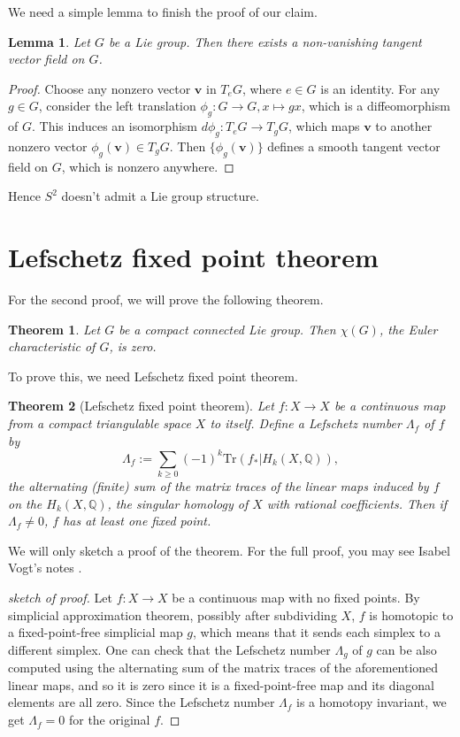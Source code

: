 \documentclass{article}
\newtheorem{theorem}{Theorem}
\newtheorem{lemma}{Lemma}
\begin{document}
We need a simple lemma to finish the proof of our claim. 
\begin{lemma}
Let $G$ be a Lie group. Then there exists a non-vanishing tangent vector field on $G$. 
\end{lemma}
\begin{proof}
Choose any nonzero vector $\mathbf{v}$ in $T_{e}G$, where $e\in G$ is an identity. For any $g\in G$, consider the left translation $\phi_{g}:G\to G, x\mapsto gx$, which is a diffeomorphism of $G$. This induces an isomorphism $d\phi_{g}:T_{e}G\to T_{g}G$, which maps $\mathbf{v}$ to another nonzero vector $\phi_{g}(\mathbf{v})\in T_{g}G$. Then $\{\phi_{g}(\mathbf{v})\}$ defines a smooth tangent vector field on $G$, which is nonzero anywhere. 
\end{proof}
Hence $S^{2}$ doesn't admit a Lie group structure.


\section{Lefschetz fixed point theorem}
For the second proof, we will prove the following theorem. 
\begin{theorem}
Let $G$ be a compact connected Lie group. Then $\chi(G)$, the Euler characteristic of $G$, is zero. 
\end{theorem}
To prove this, we need Lefschetz fixed point theorem. 

\begin{theorem}[Lefschetz fixed point theorem]
Let $f:X\to X$ be a continuous map from a compact triangulable space $X$ to itself. Define a Lefschetz number $\Lambda_{f}$ of $f$ by 
$$
\Lambda_{f}:=\sum_{k\geq 0}(-1)^{k}\mathrm{Tr}(f_{*}|H_{k}(X, \mathbb{Q})), 
$$
the alternating (finite) sum of the matrix traces of the linear maps induced by $f$ on the $H_{k}(X, \mathbb{Q})$, the singular homology of $X$ with rational coefficients. 
Then if $\Lambda_{f}\neq 0$, $f$ has at least one fixed point. 
\end{theorem}
We will only sketch a proof of the theorem. For the full proof, you may see Isabel Vogt's notes \cite{lftpf}. 
\begin{proof}[sketch of proof]
Let $f:X\to X$ be a continuous map with no fixed points. By simplicial approximation theorem, possibly after subdividing $X$, $f$ is homotopic to a fixed-point-free simplicial map $g$, which means that it sends each simplex to a different simplex. 
One can check that the Lefschetz number $\Lambda_{g}$ of $g$ can be also computed using the alternating sum of the matrix traces of the aforementioned  linear maps, and so it is zero since it is a fixed-point-free map and its diagonal elements are all zero. 
Since the Lefschetz number $\Lambda_{f}$ is a homotopy invariant, we get $\Lambda_{f}=0$ for the original $f$. 
\end{proof}
\end{document}
